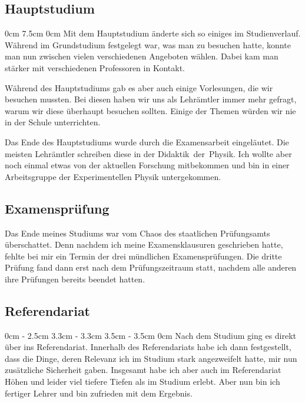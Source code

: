 \begin{multicols*}{2}

\subsection*{Hauptstudium}
0cm 7.5cm
0cm \columnwidth
Mit dem Hauptstudium änderte sich so einiges im Studienverlauf. Während im Grundstudium festgelegt war, was man zu besuchen hatte, konnte man nun zwischen vielen verschiedenen Angeboten wählen. Dabei kam man stärker mit verschiedenen Professoren in Kontakt.

Während des Hauptstudiums gab es aber auch einige Vorlesungen, die wir besuchen mussten. Bei diesen haben wir uns als Lehrämtler immer mehr gefragt, warum wir diese überhaupt besuchen sollten. Einige der Themen würden wir nie in der Schule unterrichten.

Das Ende des Hauptstudiums wurde durch die Examensarbeit eingeläutet. Die meisten Lehrämtler schreiben diese in der Didaktik~der~Physik. Ich wollte aber noch einmal etwas von der aktuellen Forschung mitbekommen und bin in einer Arbeitsgruppe der Experimentellen Physik untergekommen.

\subsection*{Examensprüfung}
Das Ende meines Studiums war vom Chaos des staatlichen Prüfungsamts überschattet. Denn nachdem ich meine Examensklausuren geschrieben hatte, fehlte bei mir ein Termin der drei mündlichen Examensprüfungen. Die dritte Prüfung fand dann erst nach dem Prüfungszeitraum statt, nachdem alle anderen ihre Prüfungen bereits beendet hatten.

\subsection*{Referendariat}
0cm \columnwidth
0cm \columnwidth
0cm \columnwidth
0cm \columnwidth
0cm \columnwidth
0cm \columnwidth
2.5cm \dimexpr\columnwidth - 2.5cm
3.3cm \dimexpr\columnwidth - 3.3cm
3.5cm \dimexpr\columnwidth - 3.5cm
0cm \columnwidth
Nach dem Studium ging es direkt über ins Referendariat. Innerhalb des Referendariats habe ich dann festgestellt, dass die Dinge, deren Relevanz ich im Studium stark angezweifelt hatte, mir nun zusätzliche Sicherheit gaben. Insgesamt habe ich aber auch im Referendariat Höhen und leider viel tiefere Tiefen als im Studium erlebt. Aber nun bin ich fertiger Lehrer und bin zufrieden mit dem Ergebnis.


\end{multicols*}
